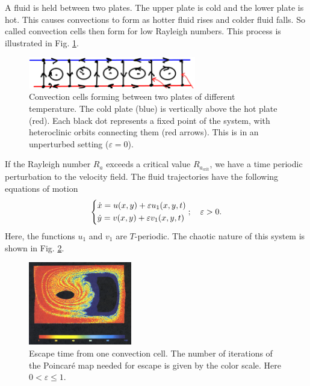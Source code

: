 \begin{ex}
	A fluid is held between two plates. The upper plate is cold and the lower plate is hot. This causes convections to form as hotter fluid rises and colder fluid falls. So called convection cells then form for low Rayleigh numbers. This process is illustrated in Fig. \ref{fig:convection_cells}.
	\begin{figure}[h!]
		\centering
		\includegraphics[width=0.65\textwidth]{figures/ch6/4convection_plates.png}
		\caption{Convection cells forming between two plates of different temperature. The cold plate (blue) is vertically above the hot plate (red). Each black dot represents a fixed point of the system, with heteroclinic orbits connecting them (red arrows). This is in an unperturbed setting ($\varepsilon =0 $).}
		\label{fig:convection_cells}
	\end{figure}

	If the Rayleigh number $R_{a}$ exceeds a critical value $R_{a_{ \textrm{crit} }}$, we have a time periodic perturbation to the velocity field. The fluid trajectories have the following equations of motion
	\begin{align}
		\begin{dcases}
			\dot{x} = u(x,y) + \varepsilon u_1(x,y,t) \\
			\dot{y} = v(x,y) + \varepsilon v_1 (x,y,t)
		\end{dcases}
;\quad \varepsilon>0.		
	\end{align}
	Here, the functions $u_1$ and $v_1$ are $T$-periodic. The chaotic nature of this system is shown in Fig. \ref{fig:convection_chaos}.
	\begin{figure}[h!]
		\centering
		\includegraphics[width=0.4\textwidth]{figures/ch6/5convection_chaos.png}
		\caption{Escape time from one convection cell. The number of iterations of the Poincaré map needed for escape is given by the color scale. Here $0 < \varepsilon \leq 1$.}
		\label{fig:convection_chaos}
	\end{figure}
	
\end{ex}

